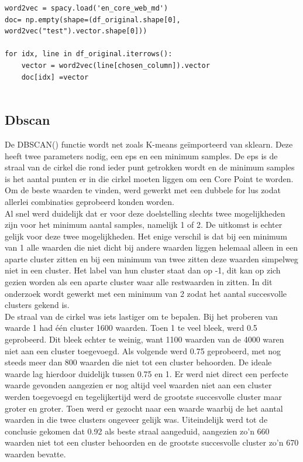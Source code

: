 \begin{lstlisting}
word2vec = spacy.load('en_core_web_md')
doc= np.empty(shape=(df_original.shape[0], word2vec("test").vector.shape[0]))

for idx, line in df_original.iterrows():
    vector = word2vec(line[chosen_column]).vector
    doc[idx] =vector


\end{lstlisting}



\subsection{Dbscan}
De DBSCAN() functie wordt net zoals K-means geïmporteerd van sklearn. Deze heeft twee parameters nodig, een eps en een minimum samples. De eps is de straal van de cirkel die rond ieder punt getrokken wordt en de minimum samples is het aantal punten er in die cirkel moeten liggen om een Core Point te worden. Om de beste waarden te vinden, werd gewerkt met een dubbele for lus zodat allerlei combinaties geprobeerd konden worden.
\\\indent
Al snel werd duidelijk dat er voor deze doelstelling slechts twee mogelijkheden zijn voor het minimum aantal samples, namelijk 1 of 2. De uitkomst is echter gelijk voor deze twee mogelijkheden. Het enige verschil is dat bij een minimum van 1 alle waarden die niet dicht bij andere waarden liggen helemaal alleen in een aparte cluster zitten en bij een minimum van twee zitten deze waarden simpelweg niet in een cluster. Het label van hun cluster staat dan op -1, dit kan op zich gezien worden als een aparte cluster waar alle restwaarden in zitten. In dit onderzoek wordt gewerkt met een minimum van 2 zodat het aantal succesvolle clusters gekend is.
\\\indent
De straal van de cirkel was iets lastiger om te bepalen. Bij het proberen van waarde 1 had één cluster 1600 waarden. Toen 1 te veel bleek, werd 0.5 geprobeerd. Dit bleek echter te weinig, want 1100 waarden van de 4000 waren niet aan een cluster toegevoegd. Als volgende werd 0.75 geprobeerd, met nog steeds meer dan 800 waarden die niet tot een cluster behoorden. De ideale waarde lag hierdoor duidelijk tussen 0.75 en 1. Er werd niet direct een perfecte waarde gevonden aangezien er nog altijd veel waarden niet aan een cluster werden toegevoegd en tegelijkertijd werd de grootste succesvolle cluster maar groter en groter. Toen werd er gezocht naar een waarde waarbij de het aantal waarden in die twee clusters ongeveer gelijk was. Uiteindelijk werd tot de conclusie gekomen dat 0.92 als beste straal aangeduid, aangezien zo'n 660 waarden niet tot een cluster behoorden en de grootste succesvolle cluster zo'n 670 waarden bevatte.
\\\indent

